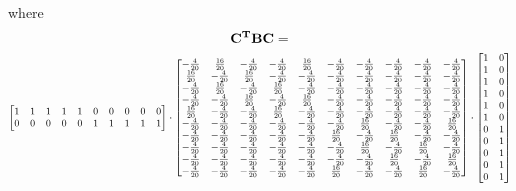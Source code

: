 \documentclass[a4paper,12pt]{article}
\begin{document}
	where 
	\[ {\bf C^T B C} = \] 
	\[\small \begin{bmatrix}
		1 & 1 & 1 & 1 & 1 & 0 & 0 & 0 & 0 & 0 \\
		0 & 0 & 0 & 0 & 0 & 1 & 1 & 1 & 1 & 1 \\
	\end{bmatrix}\cdot  \begin{bmatrix}
		-\frac{4}{20}& \frac{16}{20}& -\frac{4}{20}& -\frac{4}{20}& \frac{16}{20}& -\frac{4}{20}& -\frac{4}{20}& -\frac{4}{20}& -\frac{4}{20}& -\frac{4}{20}\\
		\frac{16}{20}& -\frac{4}{20}& \frac{16}{20}& -\frac{4}{20}& -\frac{4}{20}& -\frac{4}{20}& -\frac{4}{20}& -\frac{4}{20}& -\frac{4}{20}& -\frac{4}{20}\\
		-\frac{4}{20}& \frac{16}{20}& -\frac{4}{20}& \frac{16}{20}& -\frac{4}{20}& -\frac{4}{20}& -\frac{4}{20}& -\frac{4}{20}& -\frac{4}{20}& -\frac{4}{20}\\
		-\frac{4}{20}& -\frac{4}{20}& \frac{16}{20}& -\frac{4}{20}& \frac{16}{20}& -\frac{4}{20}& -\frac{4}{20}& -\frac{4}{20}& -\frac{4}{20}& -\frac{4}{20}\\
		\frac{16}{20}& -\frac{4}{20}& -\frac{4}{20}& \frac{16}{20}& -\frac{4}{20}& -\frac{4}{20}& -\frac{4}{20}& -\frac{4}{20}& -\frac{4}{20}& -\frac{4}{20}\\
		-\frac{4}{20}& -\frac{4}{20}& -\frac{4}{20}& -\frac{4}{20}& -\frac{4}{20}& -\frac{4}{20}& \frac{16}{20}& -\frac{4}{20}& -\frac{4}{20}& \frac{16}{20}\\
		-\frac{4}{20}& -\frac{4}{20}& -\frac{4}{20}& -\frac{4}{20}& -\frac{4}{20}& \frac{16}{20}& -\frac{4}{20}& \frac{16}{20}& -\frac{4}{20}& -\frac{4}{20}\\
		-\frac{4}{20}& -\frac{4}{20}& -\frac{4}{20}& -\frac{4}{20}& -\frac{4}{20}& -\frac{4}{20}& \frac{16}{20}& -\frac{4}{20}& \frac{16}{20}& -\frac{4}{20}\\
		-\frac{4}{20}& -\frac{4}{20}& -\frac{4}{20}& -\frac{4}{20}& -\frac{4}{20}& -\frac{4}{20}& -\frac{4}{20}& \frac{16}{20}& -\frac{4}{20}& \frac{16}{20}\\
		-\frac{4}{20}& -\frac{4}{20}& -\frac{4}{20}& -\frac{4}{20}& -\frac{4}{20}& \frac{16}{20}& -\frac{4}{20}& -\frac{4}{20}& \frac{16}{20}& -\frac{4}{20}
	\end{bmatrix} \cdot 
	\begin{bmatrix}
		1 & 0 \\ 
		1 & 0 \\
		1 & 0 \\
		1 & 0 \\ 
		1 & 0 \\ 
		1 & 0 \\ 
		0 & 1 \\ 
		0 & 1 \\ 
		0 & 1 \\ 
		0 & 1 \\ 
		0 & 1 
	\end{bmatrix}\]
	
\end{document}
